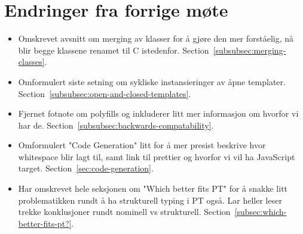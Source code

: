 
\chapter*{Endringer fra forrige møte}

\begin{itemize}
    \item Omskrevet avsnitt om merging av klasser for å gjøre den mer forståelig, nå blir begge klassene renamet til C istedenfor.
    Section~\vref{subsubsec:merging-classes}.
    \item Omformulert siste setning om sykliske instansieringer av åpne templater.
    Section~\vref{subsubsec:open-and-closed-templates}.
    \item Fjernet fotnote om polyfills og inkluderer litt mer informasjon om hvorfor vi har de.
    Section~\vref{subsubsec:backwards-compatability}.
    \item Omformulert "Code Generation" litt for å mer presist beskrive hvor whitespace blir lagt til, samt link til prettier og hvorfor vi vil ha JavaScript target.
    Section~\vref{sec:code-generation}.
    \item Har omskrevet hele seksjonen om "Which better fits PT" for å snakke litt problematikken rundt å ha strukturell typing i PT også.
    Lar heller leser trekke konklusjoner rundt nominell vs strukturell.
    Section~\vref{subsec:which-better-fits-pt?}.

\end{itemize}

